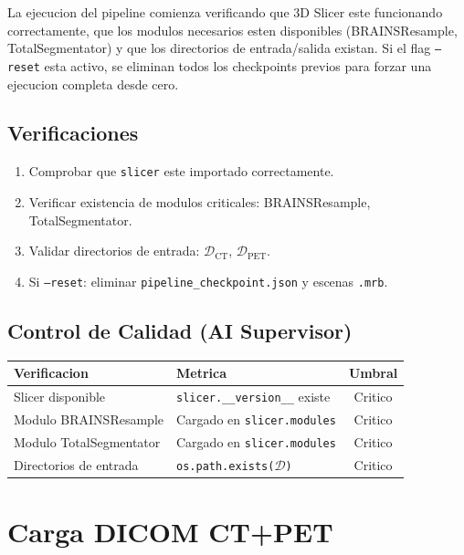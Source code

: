 \documentclass[12pt,a4paper]{article}
\begin{document}
La ejecucion del pipeline comienza verificando que 3D Slicer este funcionando correctamente, que
los modulos necesarios esten disponibles (BRAINSResample, TotalSegmentator) y que los directorios
de entrada/salida existan. Si el flag \texttt{--reset} esta activo, se eliminan todos los
checkpoints previos para forzar una ejecucion completa desde cero.

\subsection{Verificaciones}

\begin{enumerate}
    \item Comprobar que \texttt{slicer} este importado correctamente.
    \item Verificar existencia de modulos criticales: BRAINSResample, TotalSegmentator.
    \item Validar directorios de entrada: $\mathcal{D}_{\text{CT}}$, $\mathcal{D}_{\text{PET}}$.
    \item Si \texttt{--reset}: eliminar \texttt{pipeline\_checkpoint.json} y escenas \texttt{.mrb}.
\end{enumerate}

\subsection{Control de Calidad (AI Supervisor)}

\begin{table}[H]
\centering
\begin{tabular}{llc}
\toprule
\textbf{Verificacion} & \textbf{Metrica} & \textbf{Umbral} \\
\midrule
Slicer disponible & \texttt{slicer.\_\_version\_\_} existe & Critico \\
Modulo BRAINSResample & Cargado en \texttt{slicer.modules} & Critico \\
Modulo TotalSegmentator & Cargado en \texttt{slicer.modules} & Critico \\
Directorios de entrada & \texttt{os.path.exists($\mathcal{D}$)} & Critico \\
\bottomrule
\end{tabular}
\end{table}

\newpage

\section{Carga DICOM CT+PET}
\label{sec:carga}
\end{document}
